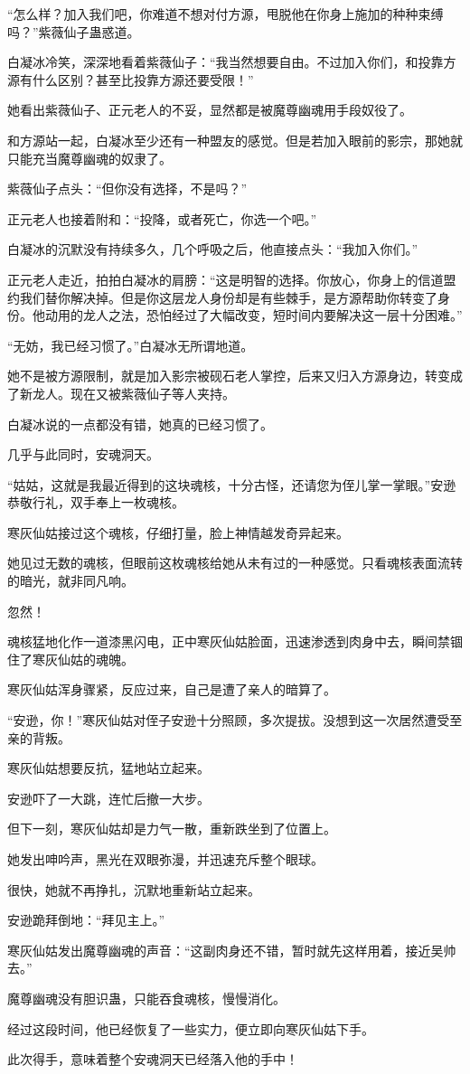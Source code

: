 \begin{this_body}
“怎么样？加入我们吧，你难道不想对付方源，甩脱他在你身上施加的种种束缚吗？”紫薇仙子蛊惑道。

白凝冰冷笑，深深地看着紫薇仙子：“我当然想要自由。不过加入你们，和投靠方源有什么区别？甚至比投靠方源还要受限！”

她看出紫薇仙子、正元老人的不妥，显然都是被魔尊幽魂用手段奴役了。

和方源站一起，白凝冰至少还有一种盟友的感觉。但是若加入眼前的影宗，那她就只能充当魔尊幽魂的奴隶了。

紫薇仙子点头：“但你没有选择，不是吗？”

正元老人也接着附和：“投降，或者死亡，你选一个吧。”

白凝冰的沉默没有持续多久，几个呼吸之后，他直接点头：“我加入你们。”

正元老人走近，拍拍白凝冰的肩膀：“这是明智的选择。你放心，你身上的信道盟约我们替你解决掉。但是你这层龙人身份却是有些棘手，是方源帮助你转变了身份。他动用的龙人之法，恐怕经过了大幅改变，短时间内要解决这一层十分困难。”

“无妨，我已经习惯了。”白凝冰无所谓地道。

她不是被方源限制，就是加入影宗被砚石老人掌控，后来又归入方源身边，转变成了新龙人。现在又被紫薇仙子等人夹持。

白凝冰说的一点都没有错，她真的已经习惯了。

几乎与此同时，安魂洞天。

“姑姑，这就是我最近得到的这块魂核，十分古怪，还请您为侄儿掌一掌眼。”安逊恭敬行礼，双手奉上一枚魂核。

寒灰仙姑接过这个魂核，仔细打量，脸上神情越发奇异起来。

她见过无数的魂核，但眼前这枚魂核给她从未有过的一种感觉。只看魂核表面流转的暗光，就非同凡响。

忽然！

魂核猛地化作一道漆黑闪电，正中寒灰仙姑脸面，迅速渗透到肉身中去，瞬间禁锢住了寒灰仙姑的魂魄。

寒灰仙姑浑身骤紧，反应过来，自己是遭了亲人的暗算了。

“安逊，你！”寒灰仙姑对侄子安逊十分照顾，多次提拔。没想到这一次居然遭受至亲的背叛。

寒灰仙姑想要反抗，猛地站立起来。

安逊吓了一大跳，连忙后撤一大步。

但下一刻，寒灰仙姑却是力气一散，重新跌坐到了位置上。

她发出呻吟声，黑光在双眼弥漫，并迅速充斥整个眼球。

很快，她就不再挣扎，沉默地重新站立起来。

安逊跪拜倒地：“拜见主上。”

寒灰仙姑发出魔尊幽魂的声音：“这副肉身还不错，暂时就先这样用着，接近吴帅去。”

魔尊幽魂没有胆识蛊，只能吞食魂核，慢慢消化。

经过这段时间，他已经恢复了一些实力，便立即向寒灰仙姑下手。

此次得手，意味着整个安魂洞天已经落入他的手中！

\end{this_body}

